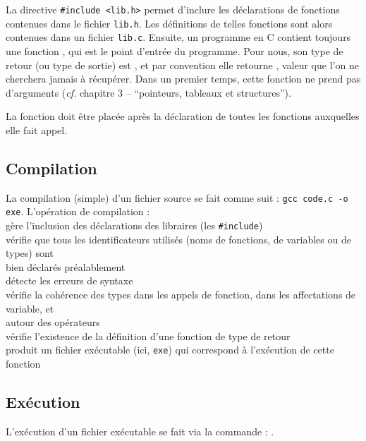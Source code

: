 		La directive \texttt{#include <lib.h>} permet d'inclure les déclarations de fonctions contenues dans le fichier \texttt{lib.h}. Les définitions de telles fonctions sont alors contenues dans un fichier \texttt{lib.c}. \nll
		Ensuite, un programme en C contient toujours une fonction , qui est le point d'entrée du programme. Pour nous, son type de retour (ou type de sortie) est , et par convention elle retourne , valeur que l'on ne cherchera jamais à récupérer.
		Dans un premier temps, cette fonction ne prend pas d'arguments (\emph{cf.} chapitre 3 -- ``pointeurs, tableaux et structures'').
		
			\begin{Remarque}
				La fonction  doit être placée après la déclaration de toutes les fonctions auxquelles elle fait appel.
			\end{Remarque}
		
	\subsection{Compilation}
	
		La compilation (simple) d'un fichier source se fait comme suit : \texttt{gcc code.c -o exe}. \nt
		L'opération de compilation : \\
			 \bdot gère l'inclusion des déclarations des libraires (les \texttt{#include}) \\
			 \bdot vérifie que tous les identificateurs utilisés (noms de fonctions, de variables ou de types) sont \\  \listspace bien déclarés préalablement \\
			 \bdot détecte les erreurs de syntaxe \\
			 \bdot vérifie la cohérence des types dans les appels de fonction, dans les affectations de variable, et \\  \listspace autour des opérateurs \\
			 \bdot vérifie l'existence de la définition d'une fonction  de type de retour  \\
			 \bdot produit un fichier exécutable (ici, \texttt{exe}) qui correspond à l'exécution de cette fonction 
			
	\subsection{Exécution}
		L'exécution d'un fichier exécutable se fait via la commande : .
		
